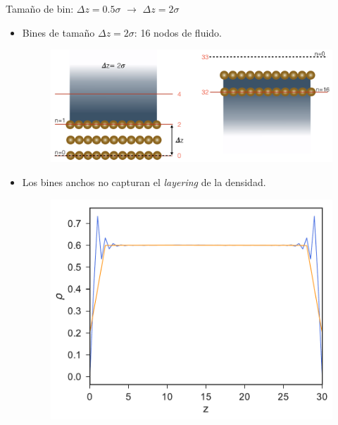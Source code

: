 \documentclass{beamer}
\begin{document}
\begin{frame}{Tamaño de bin: $\Delta z=0.5\sigma$ $\rightarrow$ $\Delta z=2\sigma$}
  \begin{itemize}
\item<1-> Bines de tamaño $\Delta z = 2\sigma$: 16 nodos de fluido. 
\begin{figure}[h!]
\includegraphics[width=0.75\linewidth]{bin_size-top-bottom_17nodos_cut}
\end{figure}
\item<2-> Los bines anchos no capturan el \textit{layering} de la densidad.
\begin{figure}[h!]
\includegraphics[width=0.48\linewidth]{DensityProfile-WALLS}
\end{figure}
  \end{itemize}
\end{frame}

\end{document}
